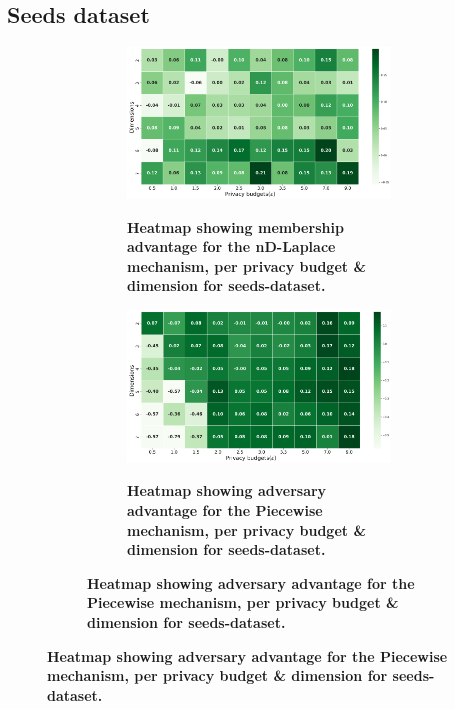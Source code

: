 \subsection{Seeds dataset}
\begin{figure}[H]
  \centering
  \begin{subfigure}[b]{0.75\textwidth}
    \begin{subfigure}[c]{1\textwidth}
      \caption{\textbf{Heatmap showing membership advantage for the nD-Laplace mechanism, per privacy budget \& dimension for seeds-dataset.}}
      \includegraphics[width=1\textwidth]{Results/nd-laplace/nd-Laplace/seeds-dataset/attack_adv.png}
      \label{fig:privacy_seeds-dataset_adversial_advantage_kd-laplace}
    \end{subfigure}
    \vfill %

    \begin{subfigure}[c]{1\textwidth}
      \caption{\textbf{Heatmap showing adversary advantage for the Piecewise mechanism, per privacy budget \& dimension for seeds-dataset.}}
      \includegraphics[width=1\textwidth]{Results/nd-laplace/piecewise/seeds-dataset/attack_adv.png}
      \label{fig:privacy_seeds-dataset_adversial_advantage_piecewise}
    \end{subfigure}
  \end{subfigure}
\end{figure}
